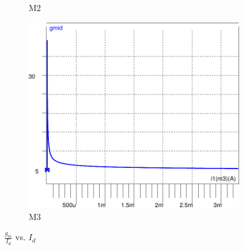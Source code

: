 \begin{figure}[!tbp]
\begin{subfigure}[b]{0.34\textwidth}
   \caption{M2}
   \label{fig:f2}
   \end{subfigure}
 \begin{subfigure}[b]{0.34\textwidth}
   \includegraphics[width=\textwidth]{images/gmid_id_m3}
   \caption{M3}
   \label{fig:f3}
   \end{subfigure}
    \caption{$\frac{g_m}{I_d}$ vs. $I_d$}

\end{figure}

